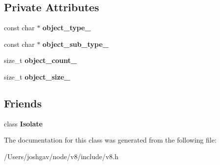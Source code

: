 \subsection*{Private Attributes}
\begin{DoxyCompactItemize}
\item 
const char $\ast$ {\bfseries object\+\_\+type\+\_\+}\hypertarget{classv8_1_1_heap_object_statistics_a990809fcfd32b55d2ad0aa4ec9452004}{}\label{classv8_1_1_heap_object_statistics_a990809fcfd32b55d2ad0aa4ec9452004}

\item 
const char $\ast$ {\bfseries object\+\_\+sub\+\_\+type\+\_\+}\hypertarget{classv8_1_1_heap_object_statistics_aa29ddbbedd1431276623fb6b12ef5945}{}\label{classv8_1_1_heap_object_statistics_aa29ddbbedd1431276623fb6b12ef5945}

\item 
size\+\_\+t {\bfseries object\+\_\+count\+\_\+}\hypertarget{classv8_1_1_heap_object_statistics_a7fc97890029c38eee4408acdc3013520}{}\label{classv8_1_1_heap_object_statistics_a7fc97890029c38eee4408acdc3013520}

\item 
size\+\_\+t {\bfseries object\+\_\+size\+\_\+}\hypertarget{classv8_1_1_heap_object_statistics_afe0db82334e2f2eb0e8d3a7932180534}{}\label{classv8_1_1_heap_object_statistics_afe0db82334e2f2eb0e8d3a7932180534}

\end{DoxyCompactItemize}
\subsection*{Friends}
\begin{DoxyCompactItemize}
\item 
class {\bfseries Isolate}\hypertarget{classv8_1_1_heap_object_statistics_aba4f0964bdacf2bbf62cf876e5d28d0a}{}\label{classv8_1_1_heap_object_statistics_aba4f0964bdacf2bbf62cf876e5d28d0a}

\end{DoxyCompactItemize}


The documentation for this class was generated from the following file\+:\begin{DoxyCompactItemize}
\item 
/\+Users/joshgav/node/v8/include/v8.\+h\end{DoxyCompactItemize}
